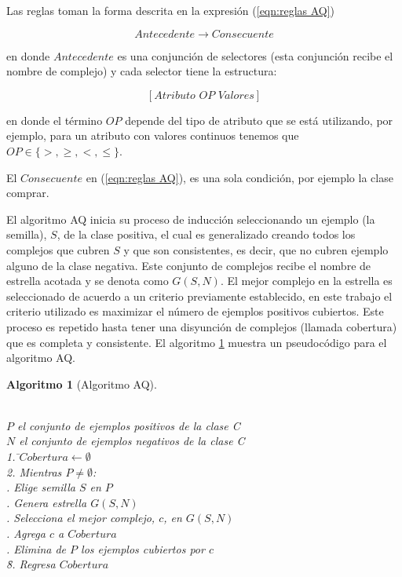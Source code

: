 \documentclass[12pt]{report}
\theoremstyle{break}
\theoremstyle{break}
\newtheorem{algoritmo}{Algoritmo}[chapter]
\begin{document}
Las reglas toman la forma descrita en la expresión (\ref{eqn:reglas AQ})

\begin{equation} \label{eqn:reglas AQ}
Antecedente \rightarrow Consecuente
\end{equation}

en donde $Antecedente$ es una conjunción de selectores (esta conjunción recibe el nombre de complejo) y cada selector tiene la estructura:

\begin{equation} \label{eqn:condicion AQ}
\left[Atributo\,\, OP\,\, Valores \right]
\end{equation}

en donde el término $OP$ depende del tipo de atributo que se está utilizando, por ejemplo, para un atributo con valores continuos tenemos que $OP \in \{>, \geq, <, \leq\}$.

El $Consecuente$ en (\ref{eqn:reglas AQ}), es una sola condición, por ejemplo la clase comprar.

El algoritmo AQ inicia su proceso de inducción seleccionando un ejemplo (la semilla), $S$, de la clase positiva, el cual es generalizado creando todos los complejos que cubren $S$ y que son consistentes, es decir, que no cubren ejemplo alguno de la clase negativa. Este conjunto de complejos recibe el nombre de estrella acotada y se denota como $G(S,N)$. El mejor complejo en la estrella es seleccionado de acuerdo a un criterio previamente establecido, en este trabajo el criterio utilizado es maximizar el número de ejemplos positivos cubiertos. Este proceso es repetido hasta tener una disyunción de complejos (llamada cobertura) que es completa y consistente. El algoritmo \ref{algo:AQ} muestra un pseudocódigo para el algoritmo AQ.

\begin{algoritmo}[Algoritmo AQ]
\begin{tabbing}
\\$P$ el conjunto de ejemplos positivos de la clase C
\\$N$ el conjunto de ejemplos negativos de la clase C\\
1. \=$Cobertura\leftarrow \emptyset $ \\
2. Mientras $P \neq \emptyset$:\\
 . Elige semilla $S$ en $P$\\
 . Genera estrella $G(S,N)$\\
 . Selecciona el mejor complejo, $c$, en $G(S,N)$\\
 . Agrega $c$ a $Cobertura$\\
 . Elimina de $P$ los ejemplos cubiertos por $c$\\
\=8. Regresa $Cobertura$
\end{tabbing}
\label{algo:AQ}
\end{algoritmo}
\end{document}
